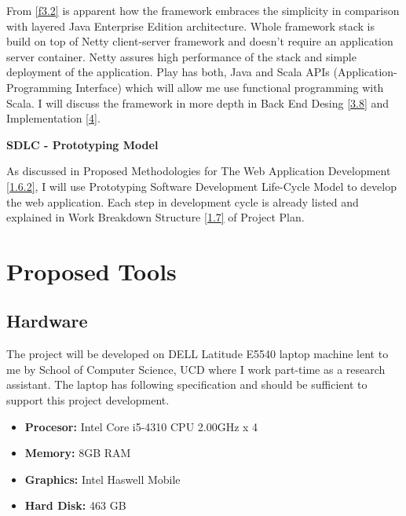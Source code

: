 \documentclass[12pt,twoside,a4paper]{report}
\begin{document}
From \cref{f3.2} is apparent how the framework embraces the simplicity in comparison with layered Java Enterprise Edition architecture. Whole framework stack is build on top of Netty\cite{19} client-server framework and doesn't require an application server container. Netty assures high performance of the stack and simple deployment of the application. Play has both, Java and Scala APIs (Application-Programming Interface) which will allow me use functional programming with Scala. I will discuss the framework in more depth in Back End Desing \cref{3.8} and Implementation \cref{4}.\par
\textbf{SDLC - Prototyping Model}\par
As discussed in Proposed Methodologies for The Web Application Development \cref{1.6.2}, I will use Prototyping Software Development Life-Cycle Model to develop the web application. Each step in development cycle is already listed and explained in Work Breakdown Structure \cref{1.7} of Project Plan.
\section{Proposed Tools}\label{3.3}
\subsection{Hardware}\label{3.3.1}
The project will be developed on DELL Latitude E5540 laptop machine lent to me by School of Computer Science, UCD where I work part-time as a research assistant. The laptop has following specification and should be sufficient to support this project development.
\begin{itemize}\itemsep1pt \parskip0pt 
\item \textbf{Procesor:} Intel Core i5-4310 CPU 2.00GHz x 4
\item \textbf{Memory:} 8GB RAM
\item \textbf{Graphics:} Intel Haswell Mobile
\item \textbf{Hard Disk:} 463 GB
\end{itemize}
\end{document}
